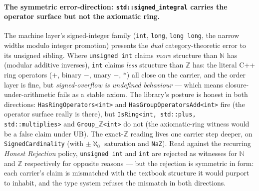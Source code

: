 \documentclass[11pt, a4paper]{report}
\begin{document}
\paragraph{The symmetric error-direction: \texttt{std::signed\_integral} carries the operator surface but not the axiomatic ring.} The machine layer's signed-integer family (\texttt{int}, \texttt{long}, \texttt{long long}, the narrow widths modulo integer promotion) presents the \emph{dual} category-theoretic error to its unsigned sibling. Where \texttt{unsigned int} claims \emph{more} structure than $\mathbb{N}$ has (modular additive inverses), \texttt{int} claims \emph{less} structure than $\mathbb{Z}$ has: the literal C++ ring operators ($+$, binary $-$, unary $-$, $*$) all close on the carrier, and the order layer is fine, but \emph{signed-overflow is undefined behaviour} --- which means closure-under-arithmetic fails as a stable axiom. The library's posture is honest in both directions: \texttt{HasRingOperators<int>} and \texttt{HasGroupOperatorsAdd<int>} fire (the operator surface really is there), but \texttt{IsRing<int, std::plus, std::multiplies>} and \texttt{Group\_}$\mathbb{Z}$\texttt{<int>} do not (the axiomatic-ring witness would be a false claim under UB). The exact-$\mathbb{Z}$ reading lives one carrier step deeper, on \texttt{SignedCardinality} (with $\pm\aleph_0$ saturation and \texttt{NaZ}). Read against the recurring \emph{Honest Rejection} policy, \texttt{unsigned int} and \texttt{int} are rejected as witnesses for $\mathbb{N}$ and $\mathbb{Z}$ respectively for opposite reasons --- but the rejection is symmetric in form: each carrier's claim is mismatched with the textbook structure it would purport to inhabit, and the type system refuses the mismatch in both directions.
\end{document}
